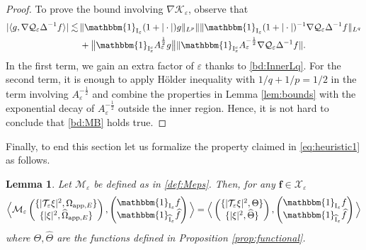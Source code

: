 \documentclass[11pt,reqno,a4paper]{amsart}
\def\eps{\varepsilon}
\newcommand{\cK}{\mathcal{K}}
\newcommand{\cM}{\mathcal{M}}
\newcommand{\cQ}{\mathcal{Q}}
\newcommand{\cT}{\mathcal{T}}
\newcommand{\cX}{\mathcal{X}}
\newcommand{\app}{\mathrm{app}}
\newcommand{\1}{\mathbbm{1}}
\newtheorem{lemma}[proposition]{Lemma}
\theoremstyle{definition}
\theoremstyle{definition}
\numberwithin{equation}{section}
\begin{document}
\begin{proof}
    To prove the bound involving $\nabla\cK_\eps$, observe that 
    \begin{align}
    |\langle g,\nabla \cQ_{\eps}\Delta^{-1}f\rangle|\lesssim \, &\|\mathbbm{1}_{{\rm I}_\eps}(1+|\cdot|)g\|_{L^p}\|\|\mathbbm{1}_{{\rm I}_\eps}(1+|\cdot|)^{-1}\nabla\cQ_{\eps}\Delta^{-1}f\|_{L^q}\\
    &+\big\|\mathbbm{1}_{{\rm I}^c_\eps}A^{\frac12}_\eps g\big\|\|\mathbbm{1}_{{\rm I}_\eps^c}A^{-\frac12}_\eps\nabla\cQ_{\eps}\Delta^{-1}f\|.\end{align}
    In the first term, we gain an extra factor of $\eps$ thanks to \cref{bd:InnerLq}. For the second term, it is enough to apply H\"older inequality with $1/q+1/p=1/2$ in the term involving $A^{-\frac12}_\eps$ and combine the properties in Lemma \ref{lem:bounds} with the exponential decay of $A_\eps^{-\frac12}$ outside the inner region. Hence, it is not hard to conclude that \cref{bd:MB} holds true.
    \end{proof}
    Finally, to end this section let us formalize the property claimed in \cref{eq:heuristic1} as follows.
    \begin{lemma}
    \label{lem:keykernel}
        Let $\cM_{\eps}$ be defined as in \cref{def:Meps}. Then, for any $\mathbf{f}\in \boldsymbol{\cX}_\eps$
        \begin{align}
    \Big\langle\cM_{\eps}\begin{pmatrix}
        \{|\cT_{\eps} \xi|^2,\Omega_{\app,E}\}\\
        \{|\xi|^2,\widehat{\Omega}_{\app,E}\}
    \end{pmatrix}, \begin{pmatrix}
        \mathbbm{1}_{{\rm I}_\eps}f\\
        \mathbbm{1}_{\widehat{{\rm I}}_\eps}\widehat{f}
\end{pmatrix}\Big\rangle=\Big\langle\begin{pmatrix}
        \{|\cT_{\eps} \xi|^2,\Theta\}\\
        \{|\xi|^2,\widehat{\Theta}\}
    \end{pmatrix},\begin{pmatrix}
        \mathbbm{1}_{{\rm I}_\eps}f\\
        \mathbbm{1}_{\widehat{{\rm I}}_\eps}\widehat{f}
\end{pmatrix}\Big\rangle
        \end{align}
        where $\Theta, \widehat{\Theta}$ are the functions defined in Proposition \ref{prop:functional}.
    \end{lemma}
\end{document}
